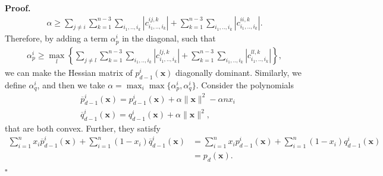 \documentclass[10pt,a4paper]{amsart}
\renewenvironment{proof}[1]{\par\medskip\noindent\textbf{#1}\enspace\ignorespaces}{\par\medskip}
\begin{document}
\begin{proof}{Proof. }
\begin{align*}
    \alpha \ge \sum_{j \neq i} \sum_{k=1}^{n-3} \sum_{i_1,..,i_k} \left \lvert c_{i_1,..,i_k}^{ij, k} \right \rvert + \sum_{k=1}^{n-3} \sum_{i_1,..,i_k} \left \lvert c_{i_1,..,i_k}^{ii, k} \right \rvert.
\end{align*}
Therefore, by adding a term $\alpha_p^i$ in the diagonal, such that 
\begin{align*}
    \alpha_p^i \ge \max_l \left\{ \sum_{j \neq l} \sum_{k=1}^{n-3} \sum_{i_1,..,i_k} \left \lvert c_{i_1,..,i_k}^{lj, k} \right \rvert + \sum_{k=1}^{n-3} \sum_{i_1,..,i_k} \left \lvert c_{i_1,..,i_k}^{ll, k} \right \rvert \right\},
\end{align*}
we can make the Hessian matrix of $p_{d-1}^i(\boldsymbol{x})$ diagonally dominant. Similarly, we define $\alpha_q^i$, and then we take $\alpha = \max_i \max\{\alpha_p^i, \alpha_q^i\}$. Consider the polynomials
\begin{align*}
    & \overline{p}_{d-1}^i(\boldsymbol{x}) = p_{d-1}^i(\boldsymbol{x}) + \alpha \|\boldsymbol{x}\|^2 - \alpha n x_i  \\
    & \overline{q}_{d-1}^i(\boldsymbol{x}) = q_{d-1}^i(\boldsymbol{x}) + \alpha \|\boldsymbol{x}\|^2,
\end{align*}     
that are both convex. Further, they satisfy
\begin{align*}
    \sum_{i=1}^n x_i\overline{p}_{d-1}^i(\boldsymbol{x}) + \sum_{i=1}^n (1-x_i) \overline{q}_{d-1}^i(\boldsymbol{x}) &= \sum_{i=1}^n x_ip_{d-1}^i(\boldsymbol{x}) + \sum_{i=1}^n (1-x_i) q_{d-1}^i(\boldsymbol{x}) \\ 
    &= p_d(\boldsymbol{x}).
\end{align*} \hfill $\square$
\end{proof} 
\end{document}
